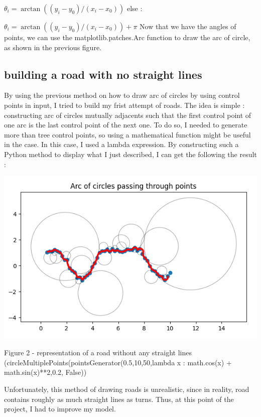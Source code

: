 \documentclass[a4paper,12pt,fleqn]{article}
\begin{document}
\mbox{$\theta_i = \arctan((y_i - y_0)/(x_i - x_0))$}
\newline
else : 

\mbox{$\theta_i = \arctan((y_i - y_0)/(x_i - x_0)) + \pi$}
\newline
\newline
Now that we have the angles of points, we can use the matplotlib.patches.Arc function to draw the arc of circle, as shown in the previous figure.


\subsection{building a road with no straight lines}
By using the previous method on how to draw arc of circles by using control points in input,  I tried to build my frist attempt of roads. The idea is simple : constructing arc of circles mutually adjacents such that the first control point of one arc is the last control point of the next one. To do so, I needed to generate more than tree control points, so using a mathematical function might be useful in the case. In this case, I used a lambda expression. By constructing such a Python method to display what I just described, I can get the following the result : 

\includegraphics{circleMultiplePoints}
\begin{center}
Figure 2 - representation of a road without any straight lines (circleMultiplePoints(pointsGenerator(0.5,10,50,lambda x : math.cos(x) + math.sin(x)**2,0.2, False))
\end{center}

Unfortunately, this method of drawing roads is unrealistic, since in reality, road contains roughly as much straight lines as turns. Thus, at this point of the project, I had to improve my model.
\end{document}
